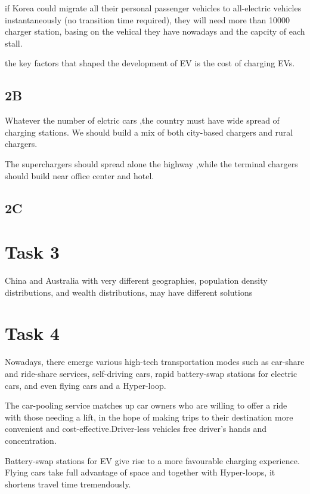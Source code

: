 \documentclass{mcmthesis}
\begin{document}
if Korea could migrate all their personal passenger vehicles to all-electric vehicles instantaneously (no transition time required), they will need more than 10000 charger station, basing on the vehical they have nowadays and the capcity of each stall.

the key factors that shaped the development of EV is the cost of charging EVs. 

\subsection{2B}

Whatever the number of elctric cars ,the country must have wide spread of charging stations. We should build a mix of both city-based chargers and  rural chargers. 

The superchargers should spread alone the highway ,while the terminal chargers should build near office center and hotel.

\subsection{2C}




\section{Task 3}

China and Australia with very different geographies, population density distributions, and wealth distributions, may have different solutions

\section{Task 4}

Nowadays, there emerge various high-tech transportation modes such as car-share and ride-share services, self-driving cars, rapid battery-swap stations for electric cars, and even flying cars and a Hyper-loop.

 The car-pooling service matches up car owners who are willing to offer a ride with those needing a lift, in the hope of making trips to their destination more convenient and cost-effective.Driver-less vehicles free driver’s hands and concentration.

Battery-swap stations for EV give rise to a more favourable charging experience. Flying cars take full advantage of space and together with Hyper-loops, it shortens travel time tremendously. 
\end{document}
